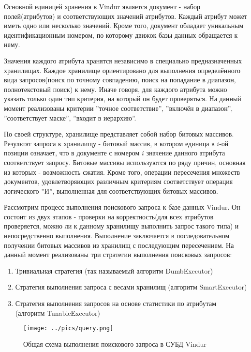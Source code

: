 \documentclass{matmex-diploma}
\begin{document}
    Основной единицей хранения в Vindur является документ - набор полей(атрибутов) и соответствующих значений атрибутов. Каждый атрибут может иметь одно или несколько значений. Кроме того, документ обладает уникальным идентификационным номером, по которому движок базы данных обращается к нему. 
    
    Значения каждого атрибута хранятся независимо в специально предназначенных хранилищах. Каждое хранилище ориентировано для выполнения определённого вида запросов(поиск по точному совпадению, поиск на попадание в диапазон, полнотекстовый поиск) к нему. Иначе говоря, для каждого атрибута можно указать только один тип критерия, на который он будет проверяться. На данный момент реализованы критерии ''точное соответствие'', ''включён в диапазон'', ''соответствует маске'', ''входит в иерархию''. 
    
    По своей структуре, хранилище представляет собой набор битовых массивов. Результат запроса к хранилищу - битовый массив, в котором единица в $i$-ой позиции означает, что в документе с номером $i$ значение данного атрибута соответствует запросу. Битовые массивы используются по ряду причин, основная из которых - возможность сжатия. Кроме того, операции пересечения множеств документов, удовлетворяющих различным критериям соответствует операция логического ''И'', выполненная для соответствующих битовых массивов. 
    
    Рассмотрим процесс выполнения поискового запроса к базе данных Vindur. Он состоит из двух этапов - проверки на корректность(для всех атрибутов проверяется, можно ли к данному хранилищу выполнить запрос такого типа) и непосредственно выполнения. Выполнение заключается в последовательном получении битовых массивов из хранилищ с последующим пересечением. На данный момент реализованы три стратегии выполнения поисковых запросов:
    \begin{enumerate}
        \item Тривиальная стратегия (так называемый алгоритм DumbExecutor)
        \item Стратегия выполнения запроса с весами хранилищ (алгоритм SmartExecutor)
        \item Стратегия выполнения запросов на основе статистики по атрибутам (алгоритм TunableExecutor)
    \end{enumerate}
    
    \begin{figure}[H]
        \label{query}
        \centering
        \texttt{[image: ../pics/query.png]}
        \caption{Общая схема выполнения поискового запроса в СУБД Vindur}
    \end{figure}
\end{document}
